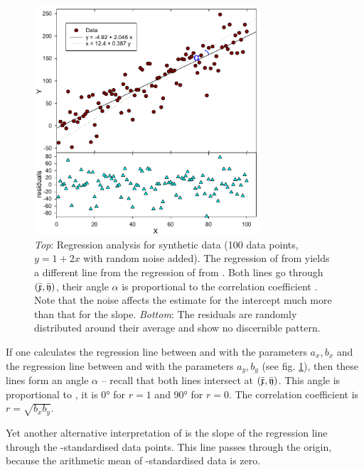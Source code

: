 \begin{refsection}
\begin{figure}
 \caption{\emph{Top}: Regression analysis for synthetic data (\num{100} data points, \(y = 1 + 2x \) with random noise added). The regression of  from  yields a different line from the regression of  from . Both lines go through \((\bar{\mathfrak{x}}, \bar{\mathfrak{y}}) \), their angle \(\alpha \) is proportional to the correlation coefficient . Note that the noise affects the estimate for the intercept much more than that for the slope. \emph{Bottom}: The residuals are randomly distributed around their average and show no discernible pattern. }
 \label{fig:CorReg}
 \centering
 \includegraphics[width=0.75\textwidth]{Graphics/Correlation-Error}
\end{figure}

If one calculates the regression line between  and  with the parameters \(a_x, b_x \) and the regression line between  and  with the parameters \(a_y, b_y \) (see fig. \ref{fig:CorReg}), then these lines form an angle \(\alpha \) -- recall that both lines intersect at \((\bar{\mathfrak{x}}, \bar{\mathfrak{y}}) \). This angle is proportional to , it is \ang{0} for \(r = 1 \) and \ang{90} for \(r = 0 \). The correlation coefficient is \(r = \sqrt{b_x b_y} \).

Yet another alternative interpretation of  is the slope of the regression line through the -standardised data points. This line passes through the origin, because the arithmetic mean of -standardised data is zero.


\end{refsection}
